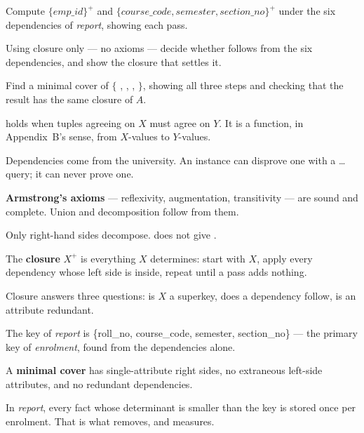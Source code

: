 \begin{checkpoint}
\begin{tightnum}
  \item Compute $\{\mathit{emp\_id}\}^{+}$ and
        $\{\mathit{course\_code}, \mathit{semester}, \mathit{section\_no}\}^{+}$
        under the six dependencies of \textit{report}, showing each pass.
  \item Using closure only --- no axioms --- decide whether
         follows from the six
        dependencies, and show the closure that settles it.
  \item Find a minimal cover of
        $\{$ , , ,  $\}$, showing all
        three steps and checking that the result has the same closure of $A$.
\end{tightnum}
\end{checkpoint}

\begin{chaptersummary}
\begin{tight}
  \item {} holds when tuples agreeing on $X$ must agree on $Y$. It is a
        function, in Appendix~B's sense, from $X$-values to $Y$-values.
  \item Dependencies come from the university. An instance can disprove one
        with a  \dots\  
        query; it can never prove one.
  \item \textbf{Armstrong's axioms} --- reflexivity, augmentation,
        transitivity --- are sound and complete. Union and decomposition
        follow from them.
  \item Only right-hand sides decompose.  does not give
        .
  \item The \textbf{closure} $X^{+}$ is everything $X$ determines: start with
        $X$, apply every dependency whose left side is inside, repeat until a
        pass adds nothing.
  \item Closure answers three questions: is $X$ a superkey, does a dependency
        follow, is an attribute redundant.
  \item The key of \textit{report} is \{roll\_no, course\_code, semester,
        section\_no\} --- the primary key of \textit{enrolment}, found from
        the dependencies alone.
  \item A \textbf{minimal cover} has single-attribute right sides, no
        extraneous left-side attributes, and no redundant dependencies.
  \item In \textit{report}, every fact whose determinant is smaller than the
        key is stored once per enrolment. That is what 
        removes, and measures.
\end{tight}
\end{chaptersummary}

